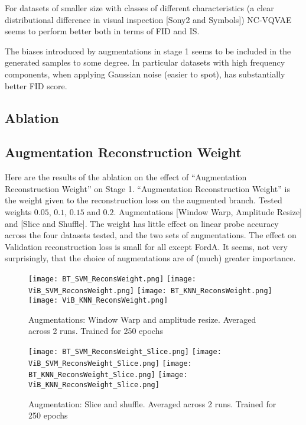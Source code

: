 \documentclass[../../thesis.tex]{subfiles}
\begin{document}
For datasets of smaller size with classes of different characteristics (a clear distributional difference in visual inspection [Sony2 and Symbols]) NC-VQVAE seems to perform better both in terms of FID and IS. \newline

The biases introduced by augmentations in stage 1 seems to be included in the generated samples to some degree. In particular datasets with high frequency components, when applying Gaussian noise (easier to spot), has substantially better FID score. 


\subsection{Ablation}

\subsection{Augmentation Reconstruction Weight}
Here are the results of the ablation on the effect of “Augmentation Reconstruction Weight” on Stage 1.
“Augmentation Reconstruction Weight” is the weight given to the reconstruction loss on the augmented branch.
Tested weights $0.05$, $0.1$, $0.15$ and $0.2$.
Augmentations [Window Warp, Amplitude Resize] and [Slice and Shuffle].
The weight has little effect on linear probe accuracy across the four datasets tested, and the two sets of augmentations.
The effect on Validation reconstruction loss is small for all except FordA.
It seems, not very surprisingly, that the choice of augmentations are of (much) greater importance.
\begin{figure}[h]
    \texttt{[image: BT\_SVM\_ReconsWeight.png]}
    \texttt{[image: ViB\_SVM\_ReconsWeight.png]}
    \texttt{[image: BT\_KNN\_ReconsWeight.png]}
    \texttt{[image: ViB\_KNN\_ReconsWeight.png]}
    \centering  
    \caption{Augmentations: Window Warp and amplitude resize. Averaged across 2 runs. Trained for 250 epochs}  
\end{figure}

\begin{figure}[h]
    \texttt{[image: BT\_SVM\_ReconsWeight\_Slice.png]}
    \texttt{[image: ViB\_SVM\_ReconsWeight\_Slice.png]}
    \texttt{[image: BT\_KNN\_ReconsWeight\_Slice.png]}
    \texttt{[image: ViB\_KNN\_ReconsWeight\_Slice.png]}

    \caption{Augmentation: Slice and shuffle. Averaged across 2 runs. Trained for 250 epochs}  
\end{figure}
\end{document}
